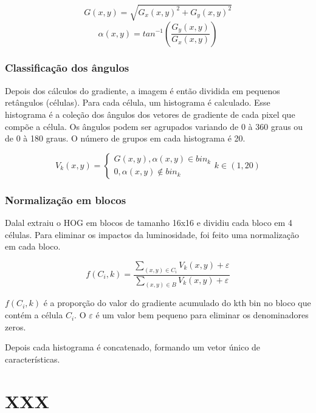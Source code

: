 \[G(x,y) = \sqrt{G_{x}(x,y)^{2} + G_{y}(x,y)^{2}}\]
\[\alpha (x,y) = tan^{-1} \left(\frac{G_{y}(x,y)}{G_{x}(x,y)}\right)\]

\subsection{Classificação dos ângulos}

Depois dos cálculos do gradiente, a imagem é então dividida em pequenos retângulos (células). Para cada célula, um histograma é calculado. Esse histograma é a coleção dos ângulos dos vetores de gradiente de cada pixel que compõe a célula. Os ângulos podem ser agrupados variando de 0 à 360 graus ou de 0 à 180 graus. O número de grupos em cada histograma é 20.

\[
V_{k}(x,y) = \left\{\begin{matrix}
G(x,y), \alpha (x,y)  \in bin_{k}\\ 
0, \alpha (x,y) \notin bin_{k}
\end{matrix}\right. k \in (1,20)
\]

\subsection{Normalização em blocos}

Dalal extraiu o HOG em blocos de tamanho 16x16 e dividiu cada bloco em 4 células. Para eliminar os impactos da luminosidade, foi feito uma normalização em cada bloco.

\[
f(C_{i},k) = \frac
{\sum_{(x,y) \in C_i}V_k(x,y) + \varepsilon}
{\sum_{(x,y) \in B}V_k(x,y) + \varepsilon}
\]

\(f(C_i,k)\) é a proporção do valor do gradiente acumulado do kth bin no bloco que contém a célula \(C_i\). O \(\varepsilon\) é um valor bem pequeno para eliminar os denominadores zeros.

Depois cada histograma é concatenado, formando um vetor único de características.

%


\chapter{XXX}

